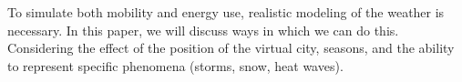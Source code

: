 To simulate both mobility and energy use, realistic modeling of the weather is necessary.
In this paper, we will discuss ways in which we can do this.
Considering the effect of the position of the virtual city, seasons, and the ability to represent specific phenomena (storms, snow, heat waves).